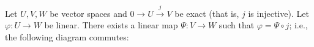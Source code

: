     \begin{proposition}
        Let $U,V,W$ be vector spaces and $0 \rightarrow U \xrightarrow{j} V$ be exact (that is, $j$ is injective). Let $\varphi:U \rightarrow W$ be linear. There exists a linear map $\Psi:V \rightarrow W$ such that $\varphi = \Psi\circ j $; i.e., the following diagram commutes:
            \begin{center}
            \end{center}
    \end{proposition}
